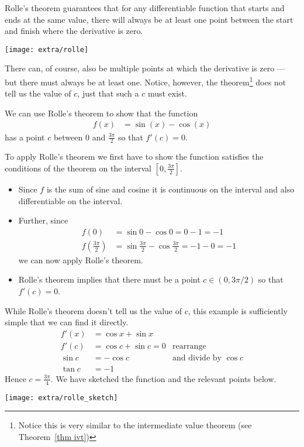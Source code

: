 Rolle's theorem guarantees that for any differentiable function that starts and ends at
the same value, there will always be at least one point between the start and finish
where the derivative is zero.
\begin{fig}
\begin{center}
 \texttt{[image: extra/rolle]}
\end{center}
\end{fig}
There can, of course, also be multiple points at which the derivative is zero --- but
there must always be at least one. Notice, however, the theorem\footnote{Notice this is
very similar to the intermediate value theorem (see Theorem~\ref{thm ivt})}
does not tell us the value of $c$, just that such a $c$ must exist.

\begin{eg}\label{eg_2_13_1}
We can use Rolle's theorem to show that the function
\begin{align*}
  f(x) &= \sin(x)-\cos(x)
\end{align*}
has a point $c$ between $0$ and $\frac{3\pi}{2}$ so that $f'(c)=0$.


To apply Rolle's theorem we first have to show the function satisfies the conditions of
the theorem on the interval $[0,\frac{3\pi}{2}]$.
\begin{itemize}
 \item Since $f$ is the sum of sine and cosine it is continuous on the interval and also
differentiable on the interval.
\item Further, since
\begin{align*}
  f(0) &= \sin 0 - \cos 0 = 0-1 = -1  \\
  f\left(\frac{3\pi}{2}\right) &= \sin\frac{3\pi}{2} - \cos\frac{3\pi}{2} = -1-0 = -1
\end{align*}
  we can now apply Rolle's theorem.
\item Rolle's theorem implies that there must be a point $c \in (0,3\pi/2)$ so that
$f'(c) =0$.
\end{itemize}
While Rolle's theorem doesn't tell us the value of $c$, this example is sufficiently
simple that we can find it directly.
\begin{align*}
  f'(x) &= \cos x + \sin x\\
  f'(c) &= \cos c + \sin c  =  0 & \text{rearrange}\\
  \sin c&= - \cos c & \text{and divide by $\cos c$} \\
  \tan c &= -1
\end{align*}
Hence $c = \frac{3\pi}{4}$. We have sketched the function and the relevant points below.
\begin{efig}
\begin{center}
 \texttt{[image: extra/rolle\_sketch]}
\end{center}
\end{efig}
\end{eg}
